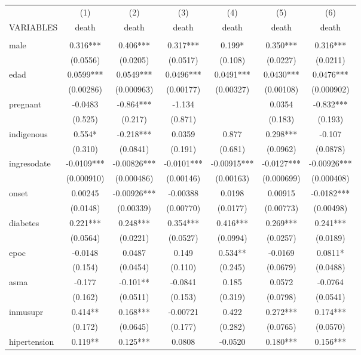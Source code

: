 \documentclass[]{article}
\begin{document}
\begin{tabular}{lcccccc} \hline
 & (1) & (2) & (3) & (4) & (5) & (6) \\
VARIABLES & death & death & death & death & death & death \\ \hline
 &  &  &  &  &  &  \\
male & 0.316*** & 0.406*** & 0.317*** & 0.199* & 0.350*** & 0.316*** \\
 & (0.0556) & (0.0205) & (0.0517) & (0.108) & (0.0227) & (0.0211) \\
edad & 0.0599*** & 0.0549*** & 0.0496*** & 0.0491*** & 0.0430*** & 0.0476*** \\
 & (0.00286) & (0.000963) & (0.00177) & (0.00327) & (0.00108) & (0.000902) \\
pregnant & -0.0483 & -0.864*** & -1.134 &  & 0.0354 & -0.832*** \\
 & (0.525) & (0.217) & (0.871) &  & (0.183) & (0.193) \\
indigenous & 0.554* & -0.218*** & 0.0359 & 0.877 & 0.298*** & -0.107 \\
 & (0.310) & (0.0841) & (0.191) & (0.681) & (0.0962) & (0.0878) \\
ingresodate & -0.0109*** & -0.00826*** & -0.0101*** & -0.00915*** & -0.0127*** & -0.00926*** \\
 & (0.000910) & (0.000486) & (0.00146) & (0.00163) & (0.000699) & (0.000408) \\
onset & 0.00245 & -0.00926*** & -0.00388 & 0.0198 & 0.00915 & -0.0182*** \\
 & (0.0148) & (0.00339) & (0.00770) & (0.0177) & (0.00773) & (0.00498) \\
diabetes & 0.221*** & 0.248*** & 0.354*** & 0.416*** & 0.269*** & 0.241*** \\
 & (0.0564) & (0.0221) & (0.0527) & (0.0994) & (0.0257) & (0.0189) \\
epoc & -0.0148 & 0.0487 & 0.149 & 0.534** & -0.0169 & 0.0811* \\
 & (0.154) & (0.0454) & (0.110) & (0.245) & (0.0679) & (0.0488) \\
asma & -0.177 & -0.101** & -0.0841 & 0.185 & 0.0572 & -0.0764 \\
 & (0.162) & (0.0511) & (0.153) & (0.319) & (0.0798) & (0.0541) \\
inmusupr & 0.414** & 0.168*** & -0.00721 & 0.422 & 0.272*** & 0.174*** \\
 & (0.172) & (0.0645) & (0.177) & (0.282) & (0.0765) & (0.0570) \\
hipertension & 0.119** & 0.125*** & 0.0808 & -0.0520 & 0.180*** & 0.156*** \\

\end{tabular}
\end{document}
